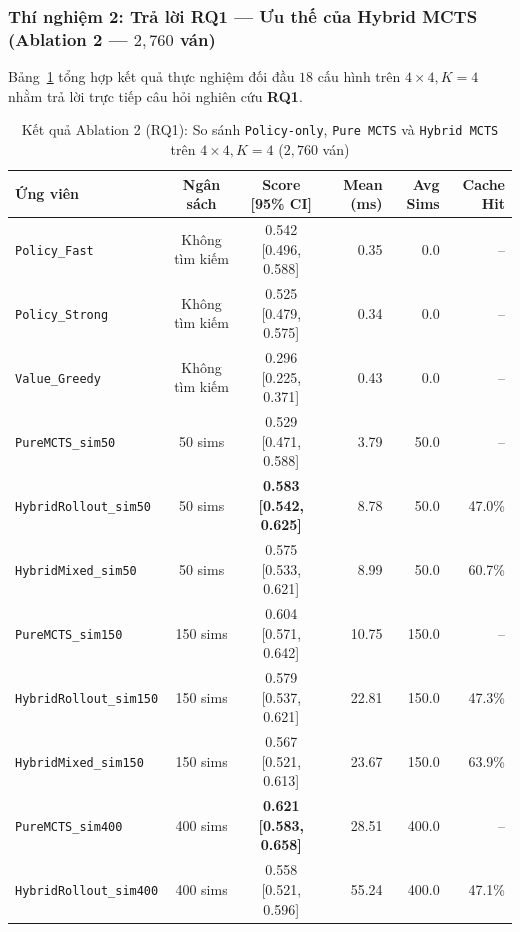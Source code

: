 \documentclass[a4paper,12pt]{report}
\begin{document}
\subsubsection{Thí nghiệm 2: Trả lời RQ1 --- Ưu thế của Hybrid MCTS (Ablation 2 --- $2{,}760$ ván)}
Bảng~\ref{tab:abl2_rq1} tổng hợp kết quả thực nghiệm đối đầu $18$ cấu hình trên $4 \times 4, K=4$ nhằm trả lời trực tiếp câu hỏi nghiên cứu \textbf{RQ1}.

\begin{table}[H]
\centering
\footnotesize
\setlength{\tabcolsep}{4pt}
\caption{Kết quả Ablation 2 (RQ1): So sánh \texttt{Policy-only}, \texttt{Pure MCTS} và \texttt{Hybrid MCTS} trên $4 \times 4, K=4$ ($2{,}760$ ván)}
\label{tab:abl2_rq1}
\vspace{0.2cm}
\begin{tabular}{p{3.8cm}ccrrr}
\toprule
\textbf{Ứng viên} & \textbf{Ngân sách} & \textbf{Score [95\% CI]} & \textbf{Mean (ms)} & \textbf{Avg Sims} & \textbf{Cache Hit} \\
\midrule
\texttt{Policy\_\allowbreak Fast} & Không tìm kiếm & 0.542 [0.496, 0.588] & 0.35 & 0.0 & -- \\
\texttt{Policy\_\allowbreak Strong} & Không tìm kiếm & 0.525 [0.479, 0.575] & 0.34 & 0.0 & -- \\
\texttt{Value\_\allowbreak Greedy} & Không tìm kiếm & 0.296 [0.225, 0.371] & 0.43 & 0.0 & -- \\
\midrule
\texttt{PureMCTS\_\allowbreak sim50} & 50 sims & 0.529 [0.471, 0.588] & 3.79 & 50.0 & -- \\
\texttt{HybridRollout\_\allowbreak sim50} & 50 sims & \textbf{0.583 [0.542, 0.625]} & 8.78 & 50.0 & 47.0\% \\
\texttt{HybridMixed\_\allowbreak sim50} & 50 sims & 0.575 [0.533, 0.621] & 8.99 & 50.0 & 60.7\% \\
\midrule
\texttt{PureMCTS\_\allowbreak sim150} & 150 sims & 0.604 [0.571, 0.642] & 10.75 & 150.0 & -- \\
\texttt{HybridRollout\_\allowbreak sim150} & 150 sims & 0.579 [0.537, 0.621] & 22.81 & 150.0 & 47.3\% \\
\texttt{HybridMixed\_\allowbreak sim150} & 150 sims & 0.567 [0.521, 0.613] & 23.67 & 150.0 & 63.9\% \\
\midrule
\texttt{PureMCTS\_\allowbreak sim400} & 400 sims & \textbf{0.621 [0.583, 0.658]} & 28.51 & 400.0 & -- \\
\texttt{HybridRollout\_\allowbreak sim400} & 400 sims & 0.558 [0.521, 0.596] & 55.24 & 400.0 & 47.1\% \\

\end{tabular}
\end{table}
\end{document}
